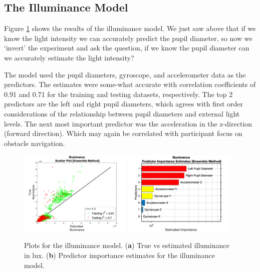 \documentclass[10pt]{article}
\begin{document}
\subsection{The Illuminance Model}

Figure \ref{fig:ILM} shows the results of the illuminance model. We just saw above that if we know the light intensity we can accurately predict the pupil diameter, so now we \lq invert' the experiment and ask the question, if we know the pupil diameter can we accurately estimate the light intensity?

The model used the pupil diameters, gyroscope, and accelerometer data as the predictors. The estimates were some-what accurate with correlation coefficients of 0.91 and 0.71 for the training and testing datasets, respectively. The top 2 predictors are the left and right pupil diameters, which agrees with first order considerations of the relationship between pupil diameters and external light levels. The next most important predictor was the acceleration in the z-direction (forward direction). Which may again be correlated with participant focus on obstacle navigation. 

\begin{figure}[!t]
  \centering
  \includegraphics[width=0.48\textwidth]{./scatterPlots/Illuminance_Ensemble_Scatter2.png}\label{fig:ILMa}
  \hfill
  \includegraphics[width=0.48\textwidth]{./importanceRankings/IlluminanceEnsembleImpRankTall.png}\label{fig:ILMb}
  \caption{Plots for the illuminance model. (\textbf{a}) True vs estimated illuminance in lux. (\textbf{b}) Predictor importance estimates for the illuminance model.
  }
  \label{fig:ILM}
\end{figure}
\end{document}
